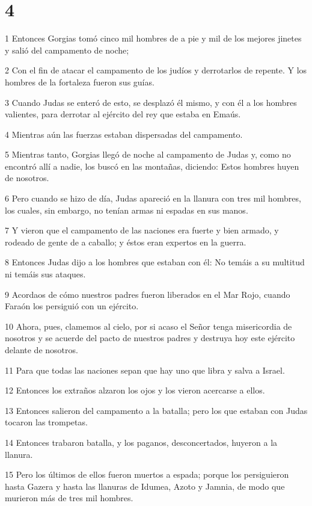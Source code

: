 \chapter{4}

\par 1 Entonces Gorgias tomó cinco mil hombres de a pie y mil de los mejores jinetes y salió del campamento de noche;
\par 2 Con el fin de atacar el campamento de los judíos y derrotarlos de repente. Y los hombres de la fortaleza fueron sus guías.
\par 3 Cuando Judas se enteró de esto, se desplazó él mismo, y con él a los hombres valientes, para derrotar al ejército del rey que estaba en Emaús.
\par 4 Mientras aún las fuerzas estaban dispersadas del campamento.
\par 5 Mientras tanto, Gorgias llegó de noche al campamento de Judas y, como no encontró allí a nadie, los buscó en las montañas, diciendo: Estos hombres huyen de nosotros.
\par 6 Pero cuando se hizo de día, Judas apareció en la llanura con tres mil hombres, los cuales, sin embargo, no tenían armas ni espadas en sus manos.
\par 7 Y vieron que el campamento de las naciones era fuerte y bien armado, y rodeado de gente de a caballo; y éstos eran expertos en la guerra.
\par 8 Entonces Judas dijo a los hombres que estaban con él: No temáis a su multitud ni temáis sus ataques.
\par 9 Acordaos de cómo nuestros padres fueron liberados en el Mar Rojo, cuando Faraón los persiguió con un ejército.
\par 10 Ahora, pues, clamemos al cielo, por si acaso el Señor tenga misericordia de nosotros y se acuerde del pacto de nuestros padres y destruya hoy este ejército delante de nosotros.
\par 11 Para que todas las naciones sepan que hay uno que libra y salva a Israel.
\par 12 Entonces los extraños alzaron los ojos y los vieron acercarse a ellos.
\par 13 Entonces salieron del campamento a la batalla; pero los que estaban con Judas tocaron las trompetas.
\par 14 Entonces trabaron batalla, y los paganos, desconcertados, huyeron a la llanura.
\par 15 Pero los últimos de ellos fueron muertos a espada; porque los persiguieron hasta Gazera y hasta las llanuras de Idumea, Azoto y Jamnia, de modo que murieron más de tres mil hombres.
